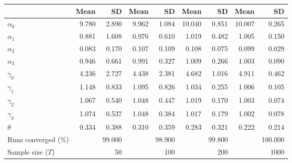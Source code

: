 
\begin{tabular}[t]{lrrrrrrrr}
\toprule
  & Mean & SD & Mean  & SD  & Mean   & SD   & Mean    & SD   \\
\midrule
$\alpha_{0}$ & 9.780 & 2.890 & 9.962 & 1.084 & 10.040 & 0.851 & 10.007 & 0.265\\
$\alpha_{1}$ & 0.881 & 1.608 & 0.976 & 0.610 & 1.019 & 0.482 & 1.005 & 0.150\\
$\alpha_{2}$ & 0.083 & 0.170 & 0.107 & 0.109 & 0.108 & 0.075 & 0.099 & 0.029\\
$\alpha_{3}$ & 0.946 & 0.661 & 0.991 & 0.327 & 1.009 & 0.266 & 1.003 & 0.090\\
$\gamma_{0}$ & 4.236 & 2.727 & 4.438 & 2.381 & 4.682 & 1.016 & 4.911 & 0.462\\
$\gamma_{1}$ & 1.148 & 0.833 & 1.095 & 0.826 & 1.034 & 0.255 & 1.006 & 0.105\\
$\gamma_{2}$ & 1.067 & 0.540 & 1.048 & 0.447 & 1.019 & 0.170 & 1.003 & 0.074\\
$\gamma_{3}$ & 1.074 & 0.537 & 1.048 & 0.384 & 1.017 & 0.179 & 1.002 & 0.078\\
$\theta$ & 0.334 & 0.388 & 0.310 & 0.359 & 0.283 & 0.321 & 0.222 & 0.214\\
Runs converged (\%) &  & 99.000 &  & 98.900 &  & 99.800 &  & 100.000\\
Sample size ($T$) &  & 50 &  & 100 &  & 200 &  & 1000\\
\bottomrule
\end{tabular}
